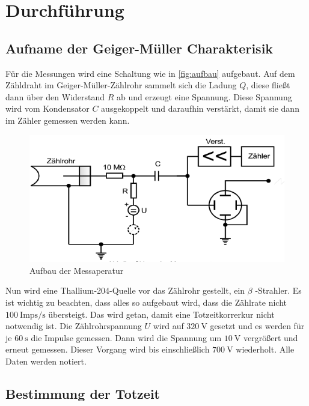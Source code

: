 \section{Durchführung}
\label{sec:Durchführung}


\subsection{Aufname der Geiger-Müller Charakterisik}
\label{ssec:d1}

Für die Messungen wird eine Schaltung wie in \autoref{fig:aufbau} aufgebaut.
Auf dem Zähldraht im Geiger-Müller-Zählrohr sammelt sich die Ladung $Q$, diese fließt dann über den Widerstand $R$ ab und erzeugt eine Spannung.
Diese Spannung wird vom Kondensator $C$ ausgekoppelt und daraufhin verstärkt, damit sie dann im Zähler gemessen werden kann.


\begin{figure}
    \centering
    \includegraphics[width=\textwidth]{images/bild1.png}
    \caption{Aufbau der Messaperatur}
    \label{fig:aufbau}
\end{figure}

Nun wird eine Thallium-204-Quelle vor das Zählrohr gestellt, ein $\beta$ -Strahler.
Es ist wichtig zu beachten, dass alles so aufgebaut wird, dass die Zählrate nicht $\SI{100}{\text{Imps}\per\second}$ übersteigt.
Das wird getan, damit eine Totzeitkorrerkur nicht notwendig ist.
Die Zählrohrspannung $U$ wird auf $\SI{320}{\volt}$ gesetzt und es werden für je $\SI{60}{\second}$ die Impulse gemessen.
Dann wird die Spannung um $\SI{10}{\volt}$ vergrößert und erneut gemessen.
Dieser Vorgang wird bis einschließlich $\SI{700}{\volt}$ wiederholt.
Alle Daten werden notiert.

\subsection{Bestimmung der Totzeit}
\label{ssec:d2}

